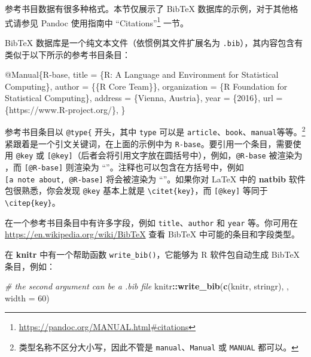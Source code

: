 \documentclass[
  12pt,
]{krantz}
\newenvironment{Shaded}{\begin{snugshade}}{\end{snugshade}}
\newcommand{\AttributeTok}[1]{\textcolor[rgb]{0.13,0.29,0.53}{#1}}
\newcommand{\CommentTok}[1]{\textcolor[rgb]{0.56,0.35,0.01}{\textit{#1}}}
\newcommand{\DataTypeTok}[1]{\textcolor[rgb]{0.13,0.29,0.53}{#1}}
\newcommand{\DecValTok}[1]{\textcolor[rgb]{0.00,0.00,0.81}{#1}}
\newcommand{\FunctionTok}[1]{\textcolor[rgb]{0.13,0.29,0.53}{\textbf{#1}}}
\newcommand{\NormalTok}[1]{#1}
\newcommand{\OtherTok}[1]{\textcolor[rgb]{0.56,0.35,0.01}{#1}}
\newcommand{\SpecialCharTok}[1]{\textcolor[rgb]{0.81,0.36,0.00}{\textbf{#1}}}
\newcommand{\StringTok}[1]{\textcolor[rgb]{0.31,0.60,0.02}{#1}}
\newcommand{\VariableTok}[1]{\textcolor[rgb]{0.00,0.00,0.00}{#1}}
\renewcommand{\href}[2]{#2\footnote{\url{#1}}}
\theoremstyle{definition}
\theoremstyle{definition}
\theoremstyle{definition}
\theoremstyle{definition}
\theoremstyle{remark}
\begin{document}
参考书目数据有很多种格式。本节仅展示了 BibTeX 数据库的示例，对于其他格式请参见 Pandoc 使用指南中 \href{https://pandoc.org/MANUAL.html\#citations}{``Citations''} 一节。

BibTeX 数据库是一个纯文本文件（依惯例其文件扩展名为 \texttt{.bib}），其内容包含有类似于以下所示的参考书目条目：

\begin{Shaded}
\begin{Highlighting}[]
\VariableTok{@Manual}\NormalTok{\{}\OtherTok{R}\NormalTok{{-}}\OtherTok{base}\NormalTok{,}
  \DataTypeTok{title}\NormalTok{ = \{R: A Language and Environment for Statistical}
\NormalTok{    Computing\},}
  \DataTypeTok{author}\NormalTok{ = \{\{R Core Team\}\},}
  \DataTypeTok{organization}\NormalTok{ = \{R Foundation for Statistical Computing\},}
  \DataTypeTok{address}\NormalTok{ = \{Vienna, Austria\},}
  \DataTypeTok{year}\NormalTok{ = \{2016\},}
  \DataTypeTok{url}\NormalTok{ = \{https://www.R{-}project.org/\},}
\NormalTok{\}}
\end{Highlighting}
\end{Shaded}

参考书目条目以 \texttt{@type\{} 开头，其中 \texttt{type} 可以是 \texttt{article}、\texttt{book}、\texttt{manual}等等。\footnote{类型名称不区分大小写，因此不管是 \texttt{manual}、\texttt{Manual} 或 \texttt{MANUAL} 都可以。}紧跟着是一个引文关键词，在上面的示例中为 \texttt{R-base}。要引用一个条目，需要使用 \texttt{@key} 或 \texttt{{[}@key{]}}（后者会将引用文字放在圆括号中），例如，\texttt{@R-base} 被渲染为 \citet{R-base}，而 \texttt{{[}@R-base{]}} 则渲染为 ``\citep{R-base}''。注释也可以包含在方括号中，例如 \texttt{{[}a\ note\ about,\ @R-base{]}} 将会被渲染为 ``\citep[a note about,][]{R-base}''。如果你对 LaTeX 中的 \textbf{natbib} 软件包很熟悉，你会发现 \texttt{@key} 基本上就是 \texttt{\textbackslash{}citet\{key\}}，而 \texttt{{[}@key{]}} 等同于 \texttt{\textbackslash{}citep\{key\}}。

在一个参考书目条目中有许多字段，例如 \texttt{title}、\texttt{author} 和 \texttt{year} 等。你可用在 \url{https://en.wikipedia.org/wiki/BibTeX} 查看 BibTeX 中可能的条目和字段类型。

在 \textbf{knitr} 中有一个帮助函数 \texttt{write\_bib()}，它能够为 R 软件包自动生成 BibTeX 条目，例如：

\begin{Shaded}
\begin{Highlighting}[]
\CommentTok{\# the second argument can be a .bib file}
\NormalTok{knitr}\SpecialCharTok{::}\FunctionTok{write\_bib}\NormalTok{(}\FunctionTok{c}\NormalTok{(}\StringTok{\textquotesingle{}knitr\textquotesingle{}}\NormalTok{, }\StringTok{\textquotesingle{}stringr\textquotesingle{}}\NormalTok{), }\StringTok{\textquotesingle{}\textquotesingle{}}\NormalTok{, }\AttributeTok{width =} \DecValTok{60}\NormalTok{)}
\end{Highlighting}
\end{Shaded}
\end{document}
